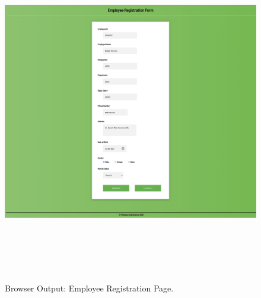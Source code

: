 \documentclass[12pt, a4]{article}
\begin{document}
\newpage
\subsection*{}
\begin{flushleft}

\end{flushleft}

\newpage
\subsection*{}
\begin{flushleft}

\end{flushleft}

\newpage
\subsection*{}
\begin{flushleft}

\end{flushleft}

\newpage
\subsection*{}
\begin{figure}[h]
\centering
\caption{Browser Output: Employee Registration Page.}
\includegraphics[height=15cm, width=18cm]{Output/Employee1.png}
\end{figure}
\end{document}
